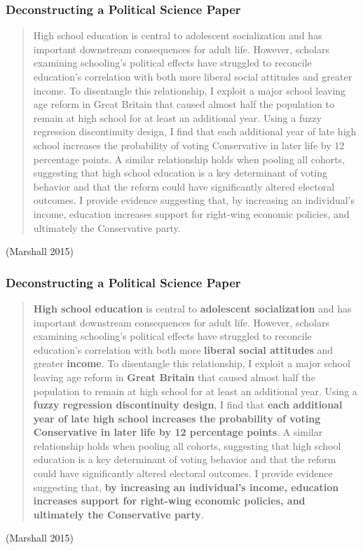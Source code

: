 \documentclass[xcolor=x11names,compress]{beamer}\usepackage[]{graphicx}\usepackage[]{xcolor}
\renewcommand{\(}{\begin{columns}}
\renewcommand{\)}{\end{columns}}
\newcommand{\<}[1]{\begin{column}{#1}}
\renewcommand{\>}{\end{column}}
\begin{document}
\begin{frame}
\frametitle{Deconstructing a Political Science Paper}
\scriptsize
\begin{quotation}
High school education is central to adolescent socialization and has important downstream consequences for adult life. However, scholars examining schooling’s political effects have struggled to reconcile education’s correlation with both more liberal social attitudes and greater income. To disentangle this relationship, I exploit a major school leaving age reform in Great Britain that caused almost half the population to
remain at high school for at least an additional year. Using a fuzzy regression discontinuity design, I find that each additional year of late high school increases the probability of voting Conservative in later life by 12 percentage points. A similar relationship holds when pooling all cohorts, suggesting that high school education is a key determinant of voting behavior and that the reform could have significantly altered
electoral outcomes. I provide evidence suggesting that, by increasing an individual’s income, education increases support for right-wing economic policies, and ultimately the Conservative party.
\end{quotation}
(Marshall 2015)
\normalsize
\end{frame}

\begin{frame}
\frametitle{Deconstructing a Political Science Paper}
\scriptsize
\begin{quotation}
\textbf{High school education} is central to \textbf{adolescent socialization} and has important downstream consequences for adult life. However, scholars examining schooling’s political effects have struggled to reconcile education’s correlation with both more \textbf{liberal social attitudes} and greater \textbf{income}. To disentangle this relationship, I exploit a major school leaving age reform in \textbf{Great Britain} that caused almost half the population to
remain at high school for at least an additional year. Using a \textbf{fuzzy regression discontinuity design}, I find that \textbf{each additional year of late high school increases the probability of voting Conservative in later life by 12 percentage points}. A similar relationship holds when pooling all cohorts, suggesting that high school education is a key determinant of voting behavior and that the reform could have significantly altered
electoral outcomes. I provide evidence suggesting that, \textbf{by increasing an individual’s income, education increases support for right-wing economic policies, and ultimately the Conservative party}.
\end{quotation}
(Marshall 2015)
\normalsize
\end{frame}
\end{document}
